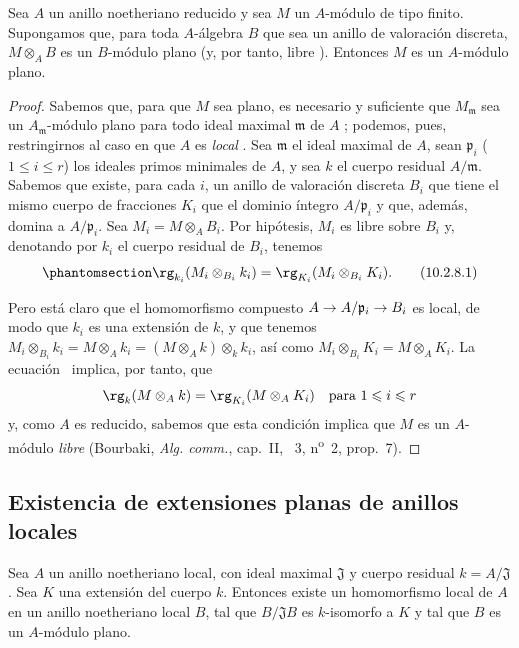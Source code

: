 \documentclass[oneside]{amsart}
\makeatletter
\renewcommand{\leq}{\leqslant}
\newcommand{\ega@arrow}[2]{\mathchoice{#1}{#2}{#2}{#2}}
\renewcommand{\to}{\ega@arrow{\longrightarrow}{\rightarrow}}
\let\EGAOriginalLabel\label
\renewcommand{\label}[1]{\phantomsection\EGAOriginalLabel{#1}}
\makeatother
\begin{document}
\begin{proposition}[10.2.8]
\label{0.10.2.8}
Sea $A$ un anillo noetheriano reducido y sea $M$ un $A$-módulo de tipo finito.
Supongamos que, para toda $A$-álgebra $B$ que sea un anillo de valoración discreta, $M\otimes_A B$ es un $B$-módulo plano (y, por tanto, libre ).
Entonces $M$ es un $A$-módulo plano.
\end{proposition}

\begin{proof}
Sabemos que, para que $M$ sea plano, es necesario y suficiente que $M_\mathfrak{m}$ sea un $A_\mathfrak{m}$-módulo plano para todo ideal maximal $\mathfrak{m}$ de $A$ ;
podemos, pues, restringirnos al caso en que $A$ es \emph{local} .
Sea $\mathfrak{m}$ el ideal maximal de $A$, sean $\mathfrak{p}_i$ ($1\leq i\leq r$) los ideales primos minimales de $A$, y sea $k$ el cuerpo residual $A/\mathfrak{m}$.
Sabemos  que existe, para cada $i$, un anillo de valoración discreta $B_i$ que tiene el mismo cuerpo de fracciones $K_i$ que el dominio íntegro $A/\mathfrak{p}_i$ y que, además, domina a $A/\mathfrak{p}_i$.
Sea $M_i=M\otimes_A B_i$.
Por hipótesis, $M_i$ es libre sobre $B_i$ y, denotando por $k_i$ el cuerpo residual de $B_i$, tenemos
\[
\label{0.10.2.8.1}
  \rg_{k_i}(M_i\otimes_{B_i}k_i)=\rg_{K_i}(M_i\otimes_{B_i}K_i).
  \tag{10.2.8.1}
\]

Pero está claro que el homomorfismo compuesto $A\to A/\mathfrak{p}_i\to B_i$ es local, de modo que $k_i$ es una extensión de $k$, y que tenemos $M_i\otimes_{B_i}k_i = M\otimes_A k_i = (M\otimes_A k)\otimes_k k_i$, así como $M_i\otimes_{B_i}K_i = M\otimes_A K_i$.
La ecuación~ implica, por tanto, que
\[
  \rg_k(M\otimes_A k)=\rg_{K_i}(M\otimes_A K_i)\quad\mbox{para $1\leq i\leq r$}
\]
y, como $A$ es reducido, sabemos que esta condición implica que $M$ es un $A$-módulo \emph{libre} (Bourbaki, \emph{Alg. comm.}, cap.~II, \textsection~3, n\textsuperscript{o}~2, prop.~7).
\end{proof}

\subsection{Existencia de extensiones planas de anillos locales}
\label{subsection:0.10.3}

\begin{proposition}[10.3.1]
\label{0.10.3.1}
Sea $A$ un anillo noetheriano local, con ideal maximal $\mathfrak{J}$ y cuerpo residual $k=A/\mathfrak{J}$.
Sea $K$ una extensión del cuerpo $k$.
Entonces existe un homomorfismo local de $A$ en un anillo noetheriano local $B$, tal que $B/\mathfrak{J}B$ es $k$-isomorfo a $K$ y tal que $B$ es un $A$-módulo plano.
\end{proposition}
\end{document}

